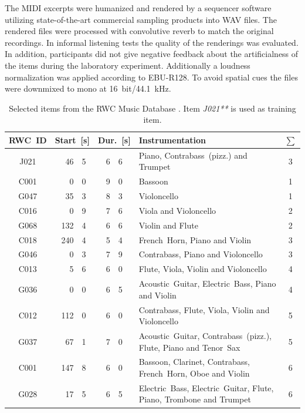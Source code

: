 The MIDI excerpts were humanized and rendered by a sequencer software utilizing state-of-the-art commercial sampling products into WAV files. The rendered files were processed with convolutive reverb to match the original recordings. In informal listening tests the quality of the renderings was evaluated. In addition, participants did not give negative feedback about the artificialness of the items during the laboratory experiment. Additionally a loudness normalization was applied according to EBU-R128\cite{EBU2011}. To avoid spatial cues the files were downmixed to mono at 16~bit/44.1~kHz.


\begin{table}[htb]
\center
\tiny
\begin{tabular}{c|r@{.}l|r@{.}l|p{3.8cm}|c}
\toprule[1.5pt]
RWC~ID & \multicolumn{2}{c}{Start~[s]} & \multicolumn{2}{c}{Dur.~[s]} & Instrumentation & $\sum$\\
\midrule
\hline
J021 & 46 & 5 & 6 & 6 & Piano, Contrabass~(pizz.) and Trumpet & 3\\
\hline
\hline
C001 & 0&0 & 9&0 & Bassoon & 1  \\
G047 & 35&3 & 8&3 & Violoncello & 1 \\
\hline
C016 & 0&9 & 7&6 & Viola and Violoncello & 2\\
G068 & 132&4 & 6&6 & Violin and Flute &  2\\
\hline
C018 & 240&4 & 5&4 & French~Horn, Piano and Violin & 3\\
G046 & 0&3 & 7&9 & Contrabass, Piano and Violoncello & 3\\
\hline
C013 & 5&6 & 6&0 & Flute, Viola, Violin and Violoncello & 4\\
G036 & 0&0 & 6&5 &  Acoustic~Guitar, Electric~Bass, Piano  and Violin & 4\\
\hline
C012 & 112&0 & 6&0 & Contrabass, Flute, Viola, Violin and  Violoncello & 5\\
G037 & 67&1 & 7&0 & Acoustic~Guitar, Contrabass~(pizz.), Flute, Piano and Tenor~Sax & 5\\
\hline
C001 & 147&8 & 6&0 & Bassoon, Clarinet, Contrabass, French~Horn, Oboe and Violin & 6\\
G028 & 17&5 & 6&5 & Electric~Bass, Electric~Guitar, Flute, Piano, Trombone and Trumpet & 6\\
\hline
\bottomrule[1.5pt]
\end{tabular}
\caption{Selected items from the RWC Music Database \cite{rwc}. Item \emph{J021**} is used as training item.}
\label{tab:items}
\end{table}

